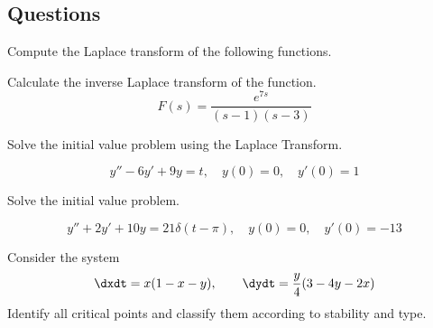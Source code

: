 \documentclass[12pt]{exam}
\begin{document}

\subsection*{Questions} 



\begin{questions}



    \question[15] 
    Compute the Laplace transform of the following functions. 
    
    \question[5] %
    Calculate the inverse Laplace transform of the function. 
    $$F(s) = \frac{e^{7s}}{(s-1)(s-3)}$$

    
    \question[10] Solve the initial value problem using the Laplace Transform. 
    
    $$y'' -6y' +9y = t, \quad y(0) =0, \quad y'(0) =1 $$
    
    \question[10] %
    Solve the initial value problem. 

    $$y'' + 2y' + 10y = 21\delta(t-\pi) , \quad y(0) = 0, \quad y'(0) = -13$$
        
    \question[10] 
    Consider the system $$\dxdt = x(1-x-y), \qquad \dydt = \frac y4 (3-4y -2x)$$
    Identify all critical points and classify them according to stability and type. 
\end{questions}
\end{document}
